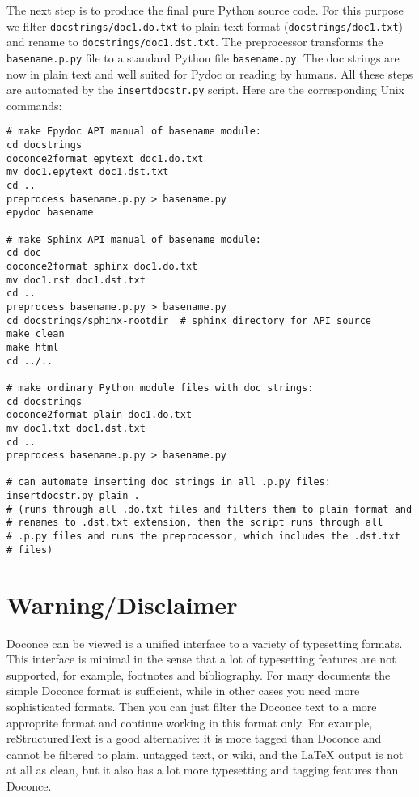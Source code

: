 \documentclass{article}
\begin{document}
The next step is to produce the final pure Python source code. For
this purpose we filter {\fontsize{10pt}{10pt}\verb!docstrings/doc1.do.txt!} to plain text format
({\fontsize{10pt}{10pt}\verb!docstrings/doc1.txt!}) and rename to {\fontsize{10pt}{10pt}\verb!docstrings/doc1.dst.txt!}. The
preprocessor transforms the {\fontsize{10pt}{10pt}\verb!basename.p.py!} file to a standard Python
file {\fontsize{10pt}{10pt}\verb!basename.py!}. The doc strings are now in plain text and well
suited for Pydoc or reading by humans. All these steps are automated
by the {\fontsize{10pt}{10pt}\verb!insertdocstr.py!} script.  Here are the corresponding Unix
commands:
\begin{Verbatim}[fontsize=\fontsize{9pt}{9pt},tabsize=8,baselinestretch=0.85,
fontfamily=tt,xleftmargin=7mm]
# make Epydoc API manual of basename module:
cd docstrings
doconce2format epytext doc1.do.txt
mv doc1.epytext doc1.dst.txt
cd ..
preprocess basename.p.py > basename.py
epydoc basename

# make Sphinx API manual of basename module:
cd doc
doconce2format sphinx doc1.do.txt
mv doc1.rst doc1.dst.txt
cd ..
preprocess basename.p.py > basename.py
cd docstrings/sphinx-rootdir  # sphinx directory for API source
make clean
make html
cd ../..

# make ordinary Python module files with doc strings:
cd docstrings
doconce2format plain doc1.do.txt
mv doc1.txt doc1.dst.txt
cd ..
preprocess basename.p.py > basename.py

# can automate inserting doc strings in all .p.py files:
insertdocstr.py plain .
# (runs through all .do.txt files and filters them to plain format and
# renames to .dst.txt extension, then the script runs through all 
# .p.py files and runs the preprocessor, which includes the .dst.txt
# files)
\end{Verbatim}
\noindent


\section*{Warning/Disclaimer}

Doconce can be viewed is a unified interface to a variety of
typesetting formats.  This interface is minimal in the sense that a
lot of typesetting features are not supported, for example, footnotes
and bibliography. For many documents the simple Doconce format is
sufficient, while in other cases you need more sophisticated
formats. Then you can just filter the Doconce text to a more
approprite format and continue working in this format only.  For
example, reStructuredText is a good alternative: it is more tagged
than Doconce and cannot be filtered to plain, untagged text, or wiki,
and the LaTeX output is not at all as clean, but it also has a lot
more typesetting and tagging features than Doconce.
\end{document}
